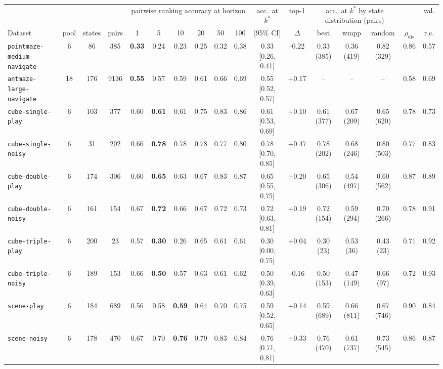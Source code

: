 \begin{tabular}{lccc|cccccc|cc|ccc|cc}
\toprule
 & & & & \multicolumn{6}{c|}{pairwise ranking accuracy at horizon} & acc.\ at $k^{*}$ & top-1 & \multicolumn{3}{c|}{acc.\ at $k^{*}$ by state distribution (pairs)} & & val.\\
Dataset & pool & states & pairs & 1 & 5 & 10 & 20 & 50 & 100 & [95\% CI] & $\Delta$ & best & wmpp & random & $\rho_{\mathrm{dis}}$ & r.c.\\
\midrule
\texttt{pointmaze-medium-navigate} & 6 & 86 & 385 & \textbf{0.33} & 0.24 & 0.23 & 0.25 & 0.32 & 0.38 & 0.33 [0.26, 0.41] & -0.22 & 0.33 (385) & 0.36 (419) & 0.82 (329) & 0.86 & 0.57 \\
\texttt{antmaze-large-navigate} & 18 & 176 & 9136 & \textbf{0.55} & 0.57 & 0.59 & 0.61 & 0.66 & 0.69 & 0.55 [0.52, 0.57] & +0.17 & -- & -- & -- & 0.58 & 0.69 \\
\texttt{cube-single-play} & 6 & 103 & 377 & 0.60 & \textbf{0.61} & 0.61 & 0.75 & 0.83 & 0.86 & 0.61 [0.53, 0.69] & +0.10 & 0.61 (377) & 0.67 (209) & 0.65 (620) & 0.78 & 0.73 \\
\texttt{cube-single-noisy} & 6 & 31 & 202 & 0.66 & \textbf{0.78} & 0.78 & 0.78 & 0.77 & 0.80 & 0.78 [0.70, 0.85] & +0.47 & 0.78 (202) & 0.68 (246) & 0.80 (503) & 0.77 & 0.83 \\
\texttt{cube-double-play} & 6 & 174 & 306 & 0.60 & \textbf{0.65} & 0.63 & 0.67 & 0.83 & 0.87 & 0.65 [0.55, 0.75] & +0.20 & 0.65 (306) & 0.54 (497) & 0.60 (562) & 0.87 & 0.89 \\
\texttt{cube-double-noisy} & 6 & 161 & 154 & 0.67 & \textbf{0.72} & 0.66 & 0.67 & 0.72 & 0.73 & 0.72 [0.63, 0.81] & +0.19 & 0.72 (154) & 0.59 (294) & 0.70 (266) & 0.78 & 0.91 \\
\texttt{cube-triple-play} & 6 & 200 & 23 & 0.57 & \textbf{0.30} & 0.26 & 0.65 & 0.61 & 0.61 & 0.30 [0.00, 0.75] & +0.04 & 0.30 (23) & 0.53 (36) & 0.43 (23) & 0.71 & 0.92 \\
\texttt{cube-triple-noisy} & 6 & 189 & 153 & 0.66 & \textbf{0.50} & 0.57 & 0.63 & 0.61 & 0.62 & 0.50 [0.39, 0.63] & -0.16 & 0.50 (153) & 0.47 (149) & 0.66 (97) & 0.72 & 0.93 \\
\texttt{scene-play} & 6 & 184 & 689 & 0.56 & 0.58 & \textbf{0.59} & 0.64 & 0.70 & 0.75 & 0.59 [0.52, 0.65] & +0.14 & 0.59 (689) & 0.66 (811) & 0.67 (746) & 0.90 & 0.84 \\
\texttt{scene-noisy} & 6 & 178 & 470 & 0.67 & 0.70 & \textbf{0.76} & 0.79 & 0.83 & 0.84 & 0.76 [0.71, 0.81] & +0.33 & 0.76 (470) & 0.61 (737) & 0.73 (545) & 0.86 & 0.87 \\

\end{tabular}

